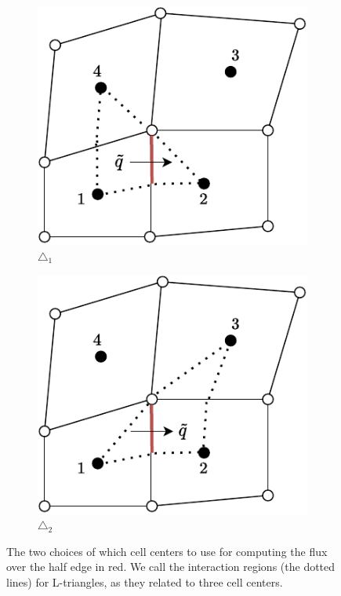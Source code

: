 \documentclass[../Main/main.tex]{subfiles}
\begin{document}
	\begin{figure}[H]
		\centering
		\begin{subfigure}[b]{0.4\textwidth}
			\centering
			\includegraphics[width=\textwidth]{left choice.pdf}
			\caption{$\triangle_1$}
		\end{subfigure}
		\hfill
		\begin{subfigure}[b]{0.4\textwidth}
			\centering
			\includegraphics[width=\textwidth]{right choice.pdf}
			\caption{$\triangle_2$}
			\label{fig:three sin x}
		\end{subfigure}
		\caption{The two choices of which cell centers to use for computing the flux over the half edge in red. We call the interaction regions (the dotted lines) for L-triangles, as they related to three cell centers.}
		\label{fig:two choices}
	\end{figure}
\end{document}
